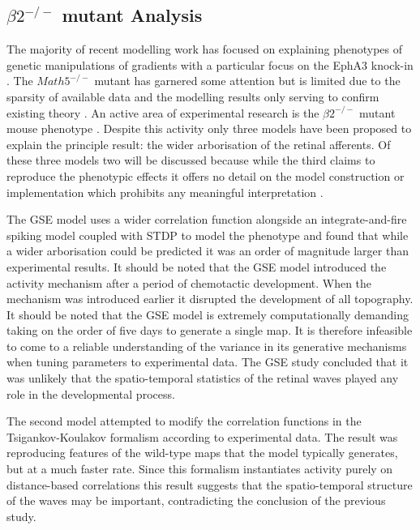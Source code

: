 \subsection{$\beta2^{-/-}$ mutant Analysis \label{sec:beta2justification}}
The majority of recent modelling work has focused on explaining phenotypes of genetic manipulations of gradients with a particular focus on the EphA3 knock-in \cite{Savier2020-xb}. The $Math5^{-/-}$ mutant has garnered some attention but is limited due to the sparsity of available data and the modelling results only serving to confirm existing theory \cite{Triplett2011-jk, Hjorth2015-le}. An active area of experimental research is the $\beta2^{-/-}$ mutant mouse phenotype  \cite{Stafford2009, Dhande2011-jp, Chandrasekaran2005-ug, Xu2015-uc}. Despite this activity only three models have been proposed to explain the principle result: the wider arborisation of the retinal afferents. Of these three models two will be discussed because while the third claims to reproduce the phenotypic effects it offers no detail on the model construction or implementation which prohibits any meaningful interpretation \cite{Xu2011-mt}.

The GSE model uses a wider correlation function alongside an integrate-and-fire spiking model coupled with STDP to model the phenotype and found that while a wider arborisation could be predicted it was an order of magnitude larger than experimental results. It should be noted that the GSE model introduced the activity mechanism after a period of chemotactic development. When the mechanism was introduced earlier it disrupted the development of all topography. It should be noted that the GSE model is extremely computationally demanding taking on the order of five days to generate a single map. It is therefore infeasible to come to a reliable understanding of the variance in its generative mechanisms when tuning parameters to experimental data. The GSE study concluded that it was unlikely that the spatio-temporal statistics of the retinal waves played any role in the developmental process.

The second model attempted to modify the correlation functions in the Tsigankov-Koulakov formalism according to experimental data. The result was reproducing features of the wild-type maps that the model typically generates, but at a much faster rate. Since this formalism instantiates activity purely on distance-based correlations this result suggests that the spatio-temporal structure of the waves may be important, contradicting the conclusion of the previous study.

